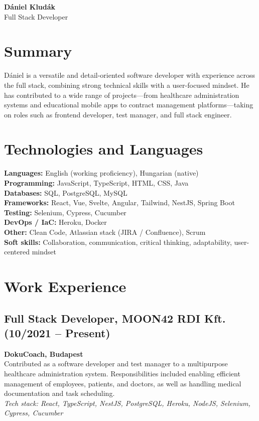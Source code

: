 \documentclass[a4paper,12pt]{article}
\begin{document}
\begin{center}
    {\LARGE \textbf{D\'aniel Klud\'ak}} \\[0.5em]
    {\large Full Stack Developer}
\end{center}

\section*{Summary}
D\'aniel is a versatile and detail-oriented software developer with experience across the full stack, combining strong technical skills with a user-focused mindset. He has contributed to a wide range of projects---from healthcare administration systems and educational mobile apps to contract management platforms---taking on roles such as frontend developer, test manager, and full stack engineer.

\section*{Technologies and Languages}
\textbf{Languages:} English (working proficiency), Hungarian (native) \\
\textbf{Programming:} JavaScript, TypeScript, HTML, CSS, Java \\
\textbf{Databases:} SQL, PostgreSQL, MySQL \\
\textbf{Frameworks:} React, Vue, Svelte, Angular, Tailwind, NestJS, Spring Boot \\
\textbf{Testing:} Selenium, Cypress, Cucumber \\
\textbf{DevOps / IaC:} Heroku, Docker \\
\textbf{Other:} Clean Code, Atlassian stack (JIRA / Confluence), Scrum \\
\textbf{Soft skills:} Collaboration, communication, critical thinking, adaptability, user-centered mindset

\section*{Work Experience}
\subsection*{Full Stack Developer, MOON42 RDI Kft. (10/2021 -- Present)}
\textbf{DokuCoach, Budapest} \\ 
Contributed as a software developer and test manager to a multipurpose healthcare administration system. Responsibilities included enabling efficient management of employees, patients, and doctors, as well as handling medical documentation and task scheduling. \\
\textit{Tech stack: React, TypeScript, NestJS, PostgreSQL, Heroku, NodeJS, Selenium, Cypress, Cucumber}
\end{document}
